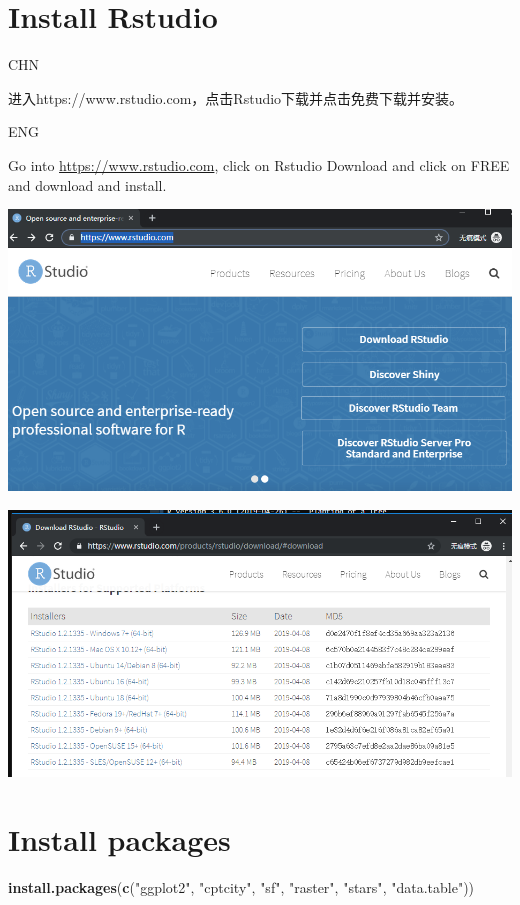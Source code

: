 \documentclass[]{book}
\newenvironment{Shaded}{\begin{snugshade}}{\end{snugshade}}
\newcommand{\KeywordTok}[1]{\textcolor[rgb]{0.13,0.29,0.53}{\textbf{#1}}}
\newcommand{\NormalTok}[1]{#1}
\newcommand{\StringTok}[1]{\textcolor[rgb]{0.31,0.60,0.02}{#1}}
\begin{document}
\hypertarget{install-rstudio}{%
\section{Install Rstudio}\label{install-rstudio}}

CHN

进入https://www.rstudio.com，点击Rstudio下载并点击免费下载并安装。

ENG

Go into \url{https://www.rstudio.com}, click on Rstudio Download and click on FREE and download and install.

\includegraphics{fig/03.png}

\includegraphics{fig/04.png}

\hypertarget{install-packages}{%
\section{Install packages}\label{install-packages}}

\begin{Shaded}
\begin{Highlighting}[]
\KeywordTok{install.packages}\NormalTok{(}\KeywordTok{c}\NormalTok{(}\StringTok{"ggplot2"}\NormalTok{, }\StringTok{"cptcity"}\NormalTok{, }\StringTok{"sf"}\NormalTok{, }\StringTok{"raster"}\NormalTok{, }\StringTok{"stars"}\NormalTok{, }\StringTok{"data.table"}\NormalTok{))}
\end{Highlighting}
\end{Shaded}
\end{document}
